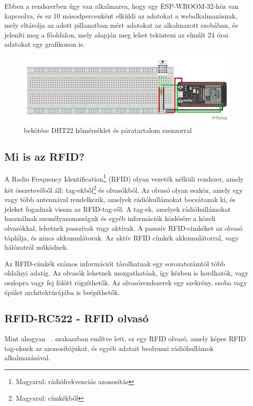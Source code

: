 \documentclass[
]{thesis-ekf}
\theoremstyle{definition}
\theoremstyle{remark}
\begin{document}
	Ebben a rendszerben úgy van alkalmazva, hogy egy ESP-WROOM-32-höz van kapcsolva, és ez 10 másodpercenként elküldi az adatokat a webalkalmazásnak, mely eltárolja az adott pillanatban mért adatokat az alkalmazott szobában, és jeleníti meg a főoldalon, mely alapján meg lehet tekinteni az elmúlt 24 órai adatokat egy grafikonon is.
		\begin{figure}[ht!]
		\centering
		\includegraphics[width=16cm]{./img/temperature and humidity sensor_bb}
		\caption{ bekötése DHT22 hőmérséklet és páratartalom szenzorral}
		\label{dht22-schematics}
	\end{figure}	
	
	\subsection{Mi is az RFID?}\label{what-is-rfid}
	A Radio Frequency Identification\footnote{Magyarul: rádiófrekvenciás azonosítás} (RFID) olyan vezeték nélküli rendszer, amely két összetevőből áll: tag-ekből\footnote{Magyarul: címkékből} és olvasókból. Az olvasó olyan eszköz, amely egy vagy több antennával rendelkezik, amelyek rádióhullámokat bocsátanak ki, és jeleket fogadnak vissza az RFID-tag-ről. A tag-ek, amelyek rádióhullámokat használnak személyazonosságuk és egyéb információk közlésére a közeli olvasókkal, lehetnek passzívak vagy aktívak. A passzív RFID-címkéket az olvasó táplálja, és nincs akkumulátoruk. Az aktív RFID címkék akkumulátorral, vagy hálózatról működnek.
	
	Az RFID-címkék számos információt tárolhatnak egy sorozatszámtól több oldalnyi adatig. Az olvasók lehetnek mozgathatóak, így kézben is hordhatók, vagy oszlopra vagy fej fölött rögzíthetők. Az olvasórendszerek egy szekrény, szoba vagy épület architektúrájába is beépíthetők.\cite{rfid-desc}
	
	\subsection{RFID-RC522 - RFID olvasó}
	Mint ahogyan ~. szakaszban említve lett, ez egy RFID olvasó, amely képes RFID tag-eknek az azonosítójukat, és egyéb adatait beolvasni rádióhullámok alkalmazásával.
	
\end{document}
